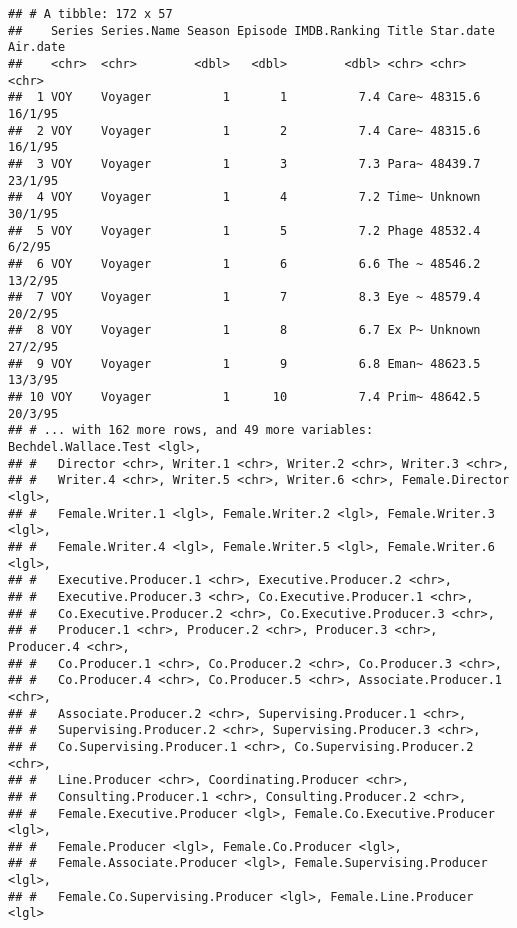 \documentclass[
]{article}
\newenvironment{Shaded}{\begin{snugshade}}{\end{snugshade}}
\newcommand{\KeywordTok}[1]{\textcolor[rgb]{0.13,0.29,0.53}{\textbf{#1}}}
\newcommand{\NormalTok}[1]{#1}
\newcommand{\OperatorTok}[1]{\textcolor[rgb]{0.81,0.36,0.00}{\textbf{#1}}}
\newcommand{\StringTok}[1]{\textcolor[rgb]{0.31,0.60,0.02}{#1}}
\begin{document}
\begin{verbatim}
## # A tibble: 172 x 57
##    Series Series.Name Season Episode IMDB.Ranking Title Star.date Air.date
##    <chr>  <chr>        <dbl>   <dbl>        <dbl> <chr> <chr>     <chr>   
##  1 VOY    Voyager          1       1          7.4 Care~ 48315.6   16/1/95 
##  2 VOY    Voyager          1       2          7.4 Care~ 48315.6   16/1/95 
##  3 VOY    Voyager          1       3          7.3 Para~ 48439.7   23/1/95 
##  4 VOY    Voyager          1       4          7.2 Time~ Unknown   30/1/95 
##  5 VOY    Voyager          1       5          7.2 Phage 48532.4   6/2/95  
##  6 VOY    Voyager          1       6          6.6 The ~ 48546.2   13/2/95 
##  7 VOY    Voyager          1       7          8.3 Eye ~ 48579.4   20/2/95 
##  8 VOY    Voyager          1       8          6.7 Ex P~ Unknown   27/2/95 
##  9 VOY    Voyager          1       9          6.8 Eman~ 48623.5   13/3/95 
## 10 VOY    Voyager          1      10          7.4 Prim~ 48642.5   20/3/95 
## # ... with 162 more rows, and 49 more variables: Bechdel.Wallace.Test <lgl>,
## #   Director <chr>, Writer.1 <chr>, Writer.2 <chr>, Writer.3 <chr>,
## #   Writer.4 <chr>, Writer.5 <chr>, Writer.6 <chr>, Female.Director <lgl>,
## #   Female.Writer.1 <lgl>, Female.Writer.2 <lgl>, Female.Writer.3 <lgl>,
## #   Female.Writer.4 <lgl>, Female.Writer.5 <lgl>, Female.Writer.6 <lgl>,
## #   Executive.Producer.1 <chr>, Executive.Producer.2 <chr>,
## #   Executive.Producer.3 <chr>, Co.Executive.Producer.1 <chr>,
## #   Co.Executive.Producer.2 <chr>, Co.Executive.Producer.3 <chr>,
## #   Producer.1 <chr>, Producer.2 <chr>, Producer.3 <chr>, Producer.4 <chr>,
## #   Co.Producer.1 <chr>, Co.Producer.2 <chr>, Co.Producer.3 <chr>,
## #   Co.Producer.4 <chr>, Co.Producer.5 <chr>, Associate.Producer.1 <chr>,
## #   Associate.Producer.2 <chr>, Supervising.Producer.1 <chr>,
## #   Supervising.Producer.2 <chr>, Supervising.Producer.3 <chr>,
## #   Co.Supervising.Producer.1 <chr>, Co.Supervising.Producer.2 <chr>,
## #   Line.Producer <chr>, Coordinating.Producer <chr>,
## #   Consulting.Producer.1 <chr>, Consulting.Producer.2 <chr>,
## #   Female.Executive.Producer <lgl>, Female.Co.Executive.Producer <lgl>,
## #   Female.Producer <lgl>, Female.Co.Producer <lgl>,
## #   Female.Associate.Producer <lgl>, Female.Supervising.Producer <lgl>,
## #   Female.Co.Supervising.Producer <lgl>, Female.Line.Producer <lgl>
\end{verbatim}

\begin{Shaded}
\end{Shaded}
\end{document}
